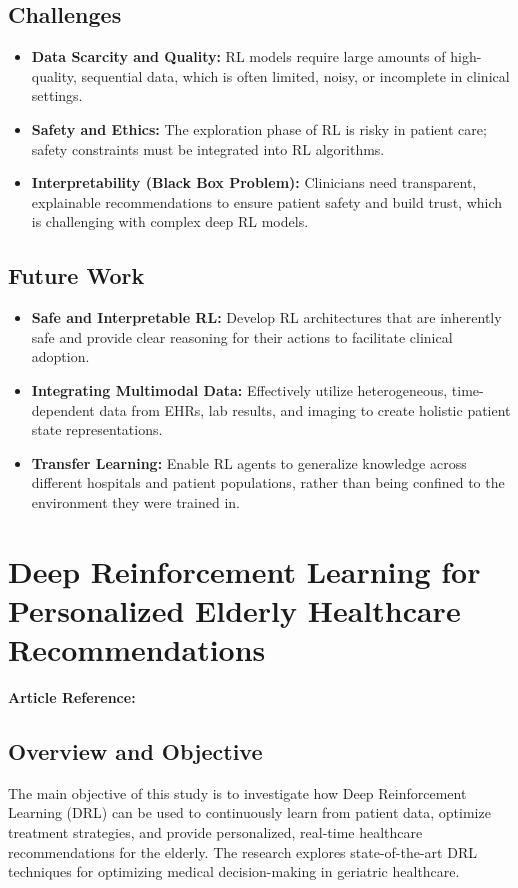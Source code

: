 \subsection*{Challenges}
\begin{itemize}
    \item \textbf{Data Scarcity and Quality:} RL models require large amounts of high-quality, sequential data, which is often limited, noisy, or incomplete in clinical settings.
    \item \textbf{Safety and Ethics:} The exploration phase of RL is risky in patient care; safety constraints must be integrated into RL algorithms.
    \item \textbf{Interpretability (Black Box Problem):} Clinicians need transparent, explainable recommendations to ensure patient safety and build trust, which is challenging with complex deep RL models.
\end{itemize}

\subsection*{Future Work}
\begin{itemize}
    \item \textbf{Safe and Interpretable RL:} Develop RL architectures that are inherently safe and provide clear reasoning for their actions to facilitate clinical adoption.
    \item \textbf{Integrating Multimodal Data:} Effectively utilize heterogeneous, time-dependent data from EHRs, lab results, and imaging to create holistic patient state representations.
    \item \textbf{Transfer Learning:} Enable RL agents to generalize knowledge across different hospitals and patient populations, rather than being confined to the environment they were trained in.
\end{itemize}

\section{Deep Reinforcement Learning for Personalized Elderly Healthcare Recommendations}
\textbf{Article Reference:} \cite{mulaniDeepReinforcementLearning2020}

\subsection*{Overview and Objective}
The main objective of this study is to investigate how Deep Reinforcement Learning (DRL) can be used to continuously learn from patient data, optimize treatment strategies, and provide personalized, real-time healthcare recommendations for the elderly. The research explores state-of-the-art DRL techniques for optimizing medical decision-making in geriatric healthcare.

